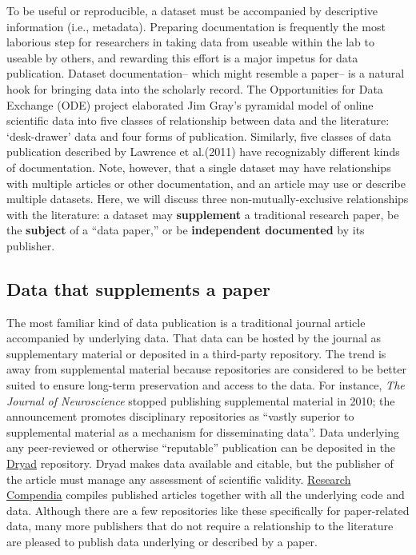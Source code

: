 \documentclass[10pt,a4paper,twocolumn]{article}
\begin{document}
{{To be useful or reproducible, a dataset must be accompanied by descriptive information (i.e., metadata)\cite{gray_online_2002}.
Preparing documentation is frequently the most laborious step for researchers in taking data from useable within the lab to useable by others, and rewarding this effort is a major impetus for data publication.
Dataset documentation-- which might resemble a paper-- is a natural hook for bringing data into the scholarly record.
The Opportunities for Data Exchange (ODE) project elaborated Jim Gray's pyramidal model of online scientific data\cite{hey_jim_2009} into five classes of relationship between data and the literature: `desk-drawer' data and four forms of publication\cite{reilly_report_2011}.
Similarly, five classes of data publication described by Lawrence et al.(2011) have recognizably different kinds of documentation\cite{lawrence_data_2011}.
Note, however, that a single dataset may have relationships with multiple articles or other documentation, and an article may use or describe multiple datasets.
Here, we will discuss three non-mutually-exclusive relationships with the literature: a dataset may \textbf{supplement} a traditional research paper, be the \textbf{subject} of a ``data paper,'' or be \textbf{independent documented} by its publisher.

\subsection*{Data that supplements a paper}\label{paper-supplement-data}

The most familiar kind of data publication is a traditional journal article accompanied by underlying data.
That data can be hosted by the journal as supplementary material or deposited in a third-party repository.
The trend is away from supplemental material because repositories are considered to be better suited to ensure long-term preservation and access to the data.
For instance, \emph{The Journal of Neuroscience} stopped publishing supplemental material in 2010; the announcement promotes disciplinary repositories as ``vastly superior to supplemental material as a mechanism for disseminating data''\cite{maunsell_announcement_2010}.
Data underlying any peer-reviewed or otherwise ``reputable'' publication can be deposited in the \href{http://datadryad.org/}{Dryad} repository.
Dryad makes data available and citable, but the publisher of the article must manage any assessment of scientific validity.
\href{http://researchcompendia.org/}{Research Compendia} compiles published articles together with all the underlying code and data.
Although there are a few repositories like these specifically for paper-related data, many more publishers that do not require a relationship to the literature are pleased to publish data underlying or described by a paper.

}}
\end{document}
